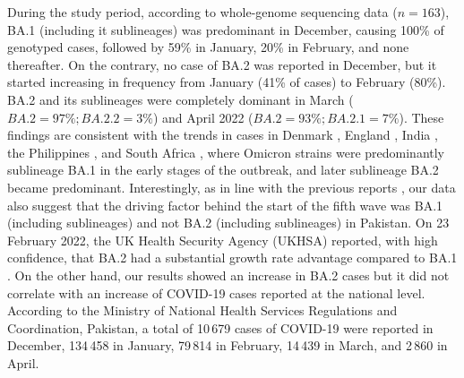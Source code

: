 During the study period, according to whole-genome sequencing data ($n=163$), BA.1 (including it sublineages) was predominant in December, causing 100\% of genotyped cases, followed by 59\%  in January, 20\% in February, and none thereafter.
On the contrary, no case of BA.2 was reported in December, but it started increasing in frequency from January (41\% of cases) to February (80\%).
BA.2 and its sublineages were completely dominant in March ($BA.2=97\%; BA.2.2=3\%$) and April 2022 ($BA.2=93\%; BA.2.1=7\%$).
These findings are consistent with the trends in cases in Denmark \citep{lyngse2022household}, England \citep{elliott2022twin}, India \citep{zaman2022omicron}, the Philippines \citep{li2022lineage}, and South Africa \citep{rahimi2022omicron}, where Omicron strains were predominantly sublineage BA.1 in the early stages of the outbreak, and later sublineage BA.2 became predominant.
Interestingly, as in line with the previous reports \citep{mahase2022covid1, mahase2022covid2}, our data also suggest that the driving factor behind the start of the fifth wave was BA.1 (including sublineages) and not BA.2 (including sublineages) in Pakistan.
On 23 February 2022, the UK Health Security Agency (UKHSA) reported, with high confidence, that BA.2 had a substantial growth rate advantage compared to BA.1 \citep{ukhsa-risk-assessment}.
On the other hand, our results showed an increase in BA.2 cases but it did not correlate with an increase of COVID-19 cases reported at the national level. 
According to the Ministry of National Health Services Regulations and Coordination, Pakistan, a total of 10\,679 cases of COVID-19 were reported in December, 134\,458 in January, 79\,814 in February, 14\,439 in March, and 2\,860 in April.

